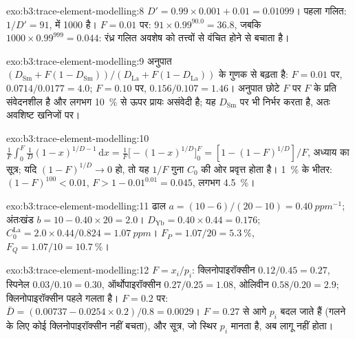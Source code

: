 \begin{solution}{exo:b3:trace-element-modelling:8}
$D' = 0.99\times0.001 + 0.01 = 0.01099$। पहला गलित: $1/D' = 91$,  में
1000 है। $F = 0.01$ पर: $91\times0.99^{90.0} = 36.8$, जबकि
$1000\times0.99^{999} = 0.044$: रंध्र गलित अवशेष को
तत्त्वों से वंचित होने से बचाता है।
\end{solution}

\begin{solution}{exo:b3:trace-element-modelling:9}
अनुपात $(D_{\mathrm{Sm}} + F(1 - D_{\mathrm{Sm}}))/(D_{\mathrm{La}}
+ F(1 - D_{\mathrm{La}}))$ के गुणक से बढ़ता है: $F = 0.01$ पर, $0.0714/0.0177 = 4.0$; $F = 0.10$ पर,
$0.156/0.107 = 1.46$। अनुपात छोटे $F$ पर $F$ के प्रति संवेदनशील है और
लगभग \qty{10}{\percent} से ऊपर प्रायः असंवेदी है; यह $D_{\mathrm{Sm}}$ पर भी निर्भर करता है,
अतः अवशिष्ट खनिजों पर।
\end{solution}

\begin{solution}{exo:b3:trace-element-modelling:10}
$\frac1F\int_0^F \frac1D(1 - x)^{1/D - 1}\,\mathrm dx = \frac1F\bigl[-(1 -
x)^{1/D}\bigr]_0^F = [1 - (1 - F)^{1/D}]/F$, अध्याय का सूत्र; यदि
$(1 - F)^{1/D} \to 0$ हो, तो यह $1/F$ गुना $C_0$ की ओर प्रवृत्त होता है। \qty{1}{\percent} के भीतर:
$(1 - F)^{100} < 0.01$, $F > 1 - 0.01^{0.01} = 0.045$, लगभग
\qty{4.5}{\percent}।
\end{solution}

\begin{solution}{exo:b3:trace-element-modelling:11}
ढाल $a = (10 - 6)/(20 - 10) = \qty{0.40}{ppm^{-1}}$; अंतःखंड $b = 10 -
0.40\times20 = 2.0$। $D_{\mathrm{Yb}} = 0.40\times0.44 = 0.176$;
$C_0^{\mathrm{La}} = 2.0\times0.44/0.824 = \qty{1.07}{ppm}$। $F_P = 1.07/20 =
\qty{5.3}{\percent}$, $F_Q = 1.07/10 = \qty{10.7}{\percent}$।
\end{solution}

\begin{solution}{exo:b3:trace-element-modelling:12}
$F = x_i/p_i$: क्लिनोपाइरॉक्सीन $0.12/0.45 = 0.27$, स्पिनेल $0.03/0.10 = 0.30$,
ऑर्थोपाइरॉक्सीन $0.27/0.25 = 1.08$, ओलिवीन $0.58/0.20 = 2.9$; क्लिनोपाइरॉक्सीन
पहले गलता है। $F = 0.2$ पर: $\bar D = (0.00737 - 0.0254\times0.2)/0.8 =
0.0029$। $F = 0.27$ से आगे $p_i$ बदल जाते हैं (गलने के लिए कोई क्लिनोपाइरॉक्सीन नहीं बचता),
और सूत्र, जो स्थिर $p_i$ मानता है, अब लागू नहीं होता।
\end{solution}

